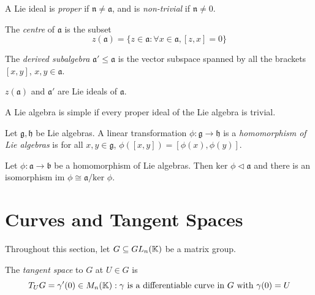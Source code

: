 A Lie ideal is {\it proper} if \(\mathfrak{n}\ne\mathfrak{a}\), and is {\it non-trivial}
if \(\mathfrak{n}\ne 0\).

\begin{definition}
  The {\it centre} of \(\mathfrak{a}\) is the subset
  \[ z(\mathfrak{a})=\{z\in\mathfrak{a}:\forall x\in\mathfrak{a}, [z,x]=0\} \]
\end{definition}

\begin{definition}
  The {\it derived subalgebra} \(\mathfrak{a}'\le\mathfrak{a}\) is the vector subspace
  spanned by all the brackets \([x,y]\), \(x,y\in\mathfrak{a}\).
\end{definition}

\begin{proposition}
  \(z(\mathfrak{a})\) and \(\mathfrak{a}'\) are Lie ideals of \(\mathfrak{a}\).
\end{proposition}

\begin{definition}
  A Lie algebra is simple if every proper ideal of the Lie algebra is trivial.
\end{definition}

\begin{definition}
  Let \(\mathfrak{g},\mathfrak{h}\) be Lie algebras. A linear transformation \(\phi:\mathfrak{g}\longrightarrow\mathfrak{h}\)
  is a {\it homomorphism of Lie algebras} is for all \(x,y\in\mathfrak{g}\),
  \(\phi([x,y])=[\phi(x),\phi(y)]\).
\end{definition}

\begin{proposition}
  Let \(\phi:\mathfrak{a}\longrightarrow\mathfrak{b}\) be a homomorphism of Lie algebras. Then
  \(\text{ker }\phi\vartriangleleft\mathfrak{a}\) and there is an isomorphism \(\text{im }\phi\cong\mathfrak{a}/\text{ker }\phi\).
\end{proposition}

\section{Curves and Tangent Spaces}

Throughout this section, let \(G\subseteq GL_n(\mathbb{K})\) be a matrix group.

\begin{definition}
  The {\it tangent space} to \(G\) at \(U\in G\) is
  \[ T_UG={\gamma'(0)\in M_n(\mathbb{K}):\gamma\text{ is a differentiable curve in }G\text{ with }\gamma(0)=U} \]
\end{definition}

